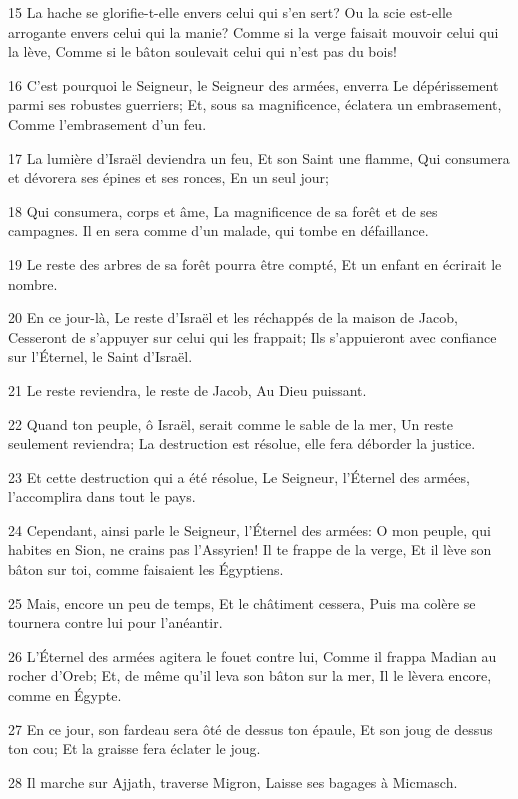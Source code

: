 \par 15 La hache se glorifie-t-elle envers celui qui s'en sert? Ou la scie est-elle arrogante envers celui qui la manie? Comme si la verge faisait mouvoir celui qui la lève, Comme si le bâton soulevait celui qui n'est pas du bois!
\par 16 C'est pourquoi le Seigneur, le Seigneur des armées, enverra Le dépérissement parmi ses robustes guerriers; Et, sous sa magnificence, éclatera un embrasement, Comme l'embrasement d'un feu.
\par 17 La lumière d'Israël deviendra un feu, Et son Saint une flamme, Qui consumera et dévorera ses épines et ses ronces, En un seul jour;
\par 18 Qui consumera, corps et âme, La magnificence de sa forêt et de ses campagnes. Il en sera comme d'un malade, qui tombe en défaillance.
\par 19 Le reste des arbres de sa forêt pourra être compté, Et un enfant en écrirait le nombre.
\par 20 En ce jour-là, Le reste d'Israël et les réchappés de la maison de Jacob, Cesseront de s'appuyer sur celui qui les frappait; Ils s'appuieront avec confiance sur l'Éternel, le Saint d'Israël.
\par 21 Le reste reviendra, le reste de Jacob, Au Dieu puissant.
\par 22 Quand ton peuple, ô Israël, serait comme le sable de la mer, Un reste seulement reviendra; La destruction est résolue, elle fera déborder la justice.
\par 23 Et cette destruction qui a été résolue, Le Seigneur, l'Éternel des armées, l'accomplira dans tout le pays.
\par 24 Cependant, ainsi parle le Seigneur, l'Éternel des armées: O mon peuple, qui habites en Sion, ne crains pas l'Assyrien! Il te frappe de la verge, Et il lève son bâton sur toi, comme faisaient les Égyptiens.
\par 25 Mais, encore un peu de temps, Et le châtiment cessera, Puis ma colère se tournera contre lui pour l'anéantir.
\par 26 L'Éternel des armées agitera le fouet contre lui, Comme il frappa Madian au rocher d'Oreb; Et, de même qu'il leva son bâton sur la mer, Il le lèvera encore, comme en Égypte.
\par 27 En ce jour, son fardeau sera ôté de dessus ton épaule, Et son joug de dessus ton cou; Et la graisse fera éclater le joug.
\par 28 Il marche sur Ajjath, traverse Migron, Laisse ses bagages à Micmasch.
